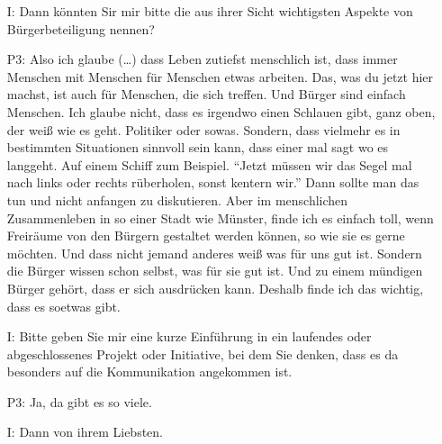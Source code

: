 \begin{itemize}
noch andere Sachen dazukommen. Also, eine Sache wird noch dazukommen, dass ich f{\"u}r M{\"u}nsteraner B{\"u}rger Themen anbiete, wie zum Beispiel "`Wie funktioniert intrinsisch motivierte Arbeit"'. Das geht so ein bisschen dass das Thema Burnout ein bisschen der Vergangenheit angeh{\"o}rt. Das Thema "`Happy working people"' und "`Sinnerf{\"u}lltes Arbeiten -- Wie geht das in M{\"u}nster"'. Das sind so die vier Themen.
    \item[I:] Dann k{\"o}nnten Sir mir bitte die aus ihrer Sicht wichtigsten Aspekte von B{\"u}rgerbeteiligung nennen?
    \item[P3:] Also ich glaube (\dots) dass Leben zutiefst menschlich ist, dass immer Menschen mit Menschen f{\"u}r Menschen etwas arbeiten. Das, was du jetzt hier machst, ist auch f{\"u}r Menschen, die sich treffen. Und B{\"u}rger sind einfach Menschen. Ich glaube nicht, dass es irgendwo einen Schlauen gibt, ganz oben, der wei{\ss} wie es geht. Politiker oder sowas. Sondern, dass vielmehr es in bestimmten Situationen sinnvoll sein kann, dass einer mal sagt wo es langgeht. Auf einem Schiff zum Beispiel. "`Jetzt m{\"u}ssen wir das Segel mal nach links oder rechts r{\"u}berholen, sonst kentern wir."' Dann sollte man das tun und nicht anfangen zu diskutieren. Aber im menschlichen Zusammenleben in so einer Stadt wie M{\"u}nster, finde ich es einfach toll, wenn Freir{\"a}ume von den B{\"u}rgern gestaltet werden k{\"o}nnen, so wie sie es gerne m{\"o}chten. Und dass nicht jemand anderes wei{\ss} was f{\"u}r uns gut ist. Sondern die B{\"u}rger wissen schon selbst, was f{\"u}r sie gut ist. Und zu einem m{\"u}ndigen B{\"u}rger geh{\"o}rt, dass er sich ausdr{\"u}cken kann. Deshalb finde ich das wichtig, dass es soetwas gibt.
    \item[I:] Bitte geben Sie mir eine kurze Einf{\"u}hrung in ein laufendes oder abgeschlossenes Projekt oder Initiative, bei dem Sie denken, dass es da besonders auf die Kommunikation angekommen ist.
    \item[P3:] Ja, da gibt es so viele.
    \item[I:] Dann von ihrem Liebsten.

\end{itemize}
